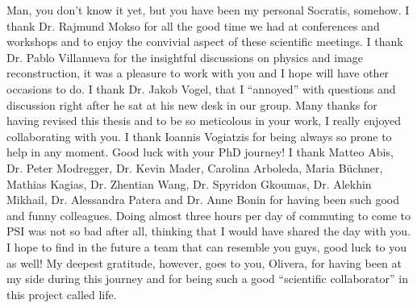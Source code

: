 {Man, you don't know it yet, but you have been my personal Socratis, somehow.
\newline\newline
I thank Dr. Rajmund Mokso for all the good time we had at conferences and workshops and to enjoy the convivial aspect of these scientific
meetings.
\newline\newline
I thank Dr. Pablo Villanueva for the insightful discussions on physics and image reconstruction, it was a pleasure to work with you and I hope
will have other occasions to do.
\newline\newline
I thank Dr. Jakob Vogel, that I ``annoyed'' with questions and discussion right after he sat at his new desk in our group. Many thanks for having
revised this thesis and to be so meticolous in your work, I really enjoyed collaborating with you.
\newline\newline
I thank Ioannis Vogiatzis for being always so prone to help in any moment. Good luck with your PhD journey!
\newline\newline
I thank Matteo Abis, Dr. Peter Modregger, Dr. Kevin Mader, Carolina Arboleda, Maria B\"{u}chner, Mathias Kagias, Dr. Zhentian Wang, Dr. Spyridon Gkoumas, 
Dr. Alekhin Mikhail, Dr. Alessandra Patera and Dr. Anne Bonin
for having been such good and funny colleagues. Doing almost three hours per day of commuting to come to PSI was not so bad after all, thinking
that I would have shared the day with you. I hope to find in the future a team that can resemble you guys, good luck to you as well!
\newline\newline
My deepest gratitude, however, goes to you, Olivera, for having been at my side during this journey and for being such a good ``scientific collaborator'' in this
project called life.
}